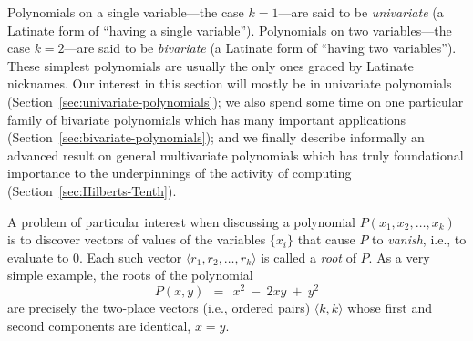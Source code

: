 \medskip

 

Polynomials on a single variable---the case $k=1$---are said to be {\it univariate} (a Latinate form of ``having a single variable'').  Polynomials on two variables---the case $k=2$---are said to be {\it bivariate} (a Latinate form of ``having two variables'').  These simplest polynomials are usually the only ones graced by Latinate nicknames.  Our interest in this section will mostly be in univariate polynomials (Section~\ref{sec:univariate-polynomials}); we also spend some time on one particular family of bivariate polynomials which has many important applications (Section~\ref{sec:bivariate-polynomials}); and we finally describe informally an advanced result on general multivariate polynomials which has truly foundational importance to the underpinnings of the activity of computing (Section~\ref{sec:Hilberts-Tenth}).

\bigskip


A problem of particular interest when discussing a polynomial $P(x_1, x_2, \ldots, x_k)$ is to discover vectors of values of the variables $\{x_i\}$ that cause $P$ to {\em vanish}, i.e., to evaluate to $0$.  Each such vector $\langle r_1, r_2, \ldots, r_k \rangle$ is called a {\it root} of $P$.  As a very simple example, the roots of the polynomial
\[ P(x,y) \ \ = \ \ x^2 \ - \ 2xy \ + \ y^2 \]
are precisely the two-place vectors (i.e., ordered pairs) $\langle k,k \rangle$ whose first and second components are identical, $x=y$.

\medskip

